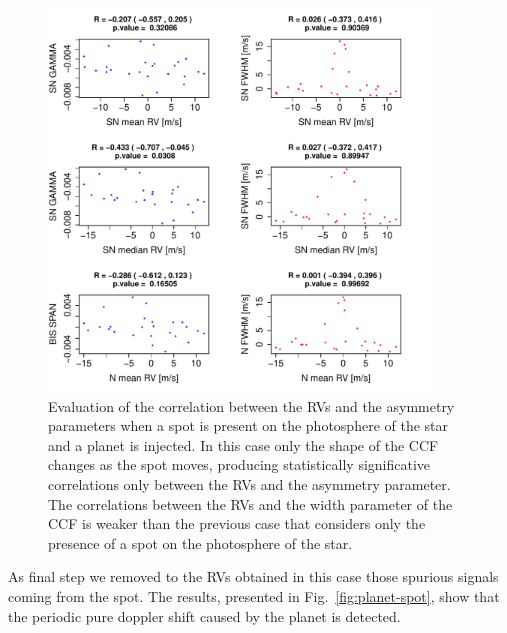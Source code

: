 \documentclass[11pt, oneside]{article}
\begin{document}
\begin{figure}[htbp]
   \centering
\includegraphics[height = 4in]{SOAP_SPOT_PLANET_Comparison_para_SN.pdf} 
   \caption{Evaluation of the correlation between the RVs and the asymmetry parameters when a spot is present on the photosphere of the star and a planet is injected.  In this case only the shape of the CCF changes as the spot moves, producing statistically significative correlations only between the RVs and the asymmetry parameter. The correlations between the RVs and the width parameter of the CCF is weaker than the previous case that considers only the presence of a spot on the photosphere of the star.}
    \label{fig:spot.plus.planet.corr}
\end{figure}

As final step we removed to the RVs obtained in this case those spurious signals coming from the spot. The results, presented in Fig.~\ref{fig:planet-spot}, show that the periodic pure doppler shift caused by the planet is detected.
\end{document}

